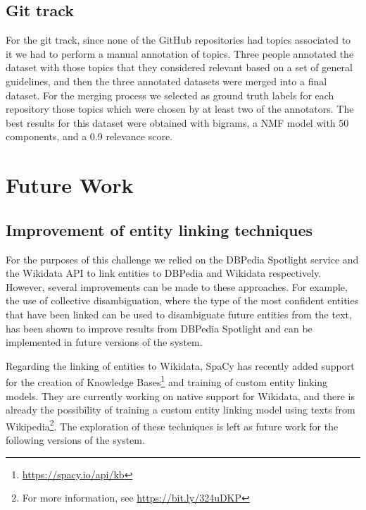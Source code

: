 \documentclass[runningheads]{llncs}
\begin{document}
\subsection{Git track}
For the git track, since none of the GitHub repositories had topics associated to it we had to perform a manual annotation of topics. Three people annotated the dataset with those topics that they considered relevant based on a set of general guidelines, and then the three annotated datasets were merged into a final dataset. For the merging process we selected as ground truth labels for each repository those topics which were chosen by at least two of the annotators. The best results for this dataset were obtained with bigrams, a NMF model with 50 components, and a 0.9 relevance score.


\section{Future Work} \label{future_work}
\subsection{Improvement of entity linking techniques}
For the purposes of this challenge we relied on the DBPedia Spotlight service and the Wikidata API to link entities to DBPedia and Wikidata respectively. However, several improvements can be made to these approaches. For example, the use of collective disambiguation, where the type of the most confident entities that have been linked can be used to disambiguate future entities from the text, has been shown to improve results from DBPedia Spotlight\cite{chabchoub2018ficlone} and can be implemented in future versions of the system.

Regarding the linking of entities to Wikidata, SpaCy has recently added support for the creation of Knowledge Bases\footnote{\url{https://spacy.io/api/kb}} and training of custom entity linking models. They are currently working on native support for Wikidata, and there is already the possibility of training a custom entity linking model using texts from Wikipedia\footnote{For more information, see \url{https://bit.ly/324uDKP}}. The exploration of these techniques is left as future work for the following versions of the system.
\end{document}
